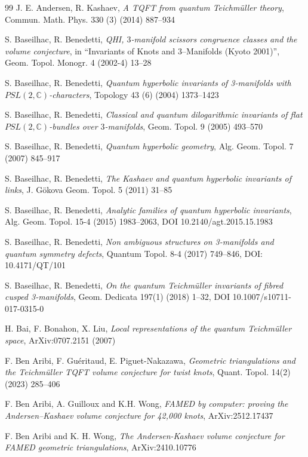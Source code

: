 \documentclass[11pt]{amsart}
\newcommand{\mc}{\mathbb{C}}
\begin{document}
\begin{thebibliography}{99} 
 J. E. Andersen, R. Kashaev, {\it A TQFT from quantum Teichm\"uller theory}, Commun. Math. Phys. 330 (3) (2014) 887--934

 S. Baseilhac, R. Benedetti, \emph{QHI, $3$-manifold scissors congruence classes and the volume conjecture}, in ``Invariants of Knots and 3--Manifolds (Kyoto 2001)'', Geom. Topol. Monogr. 4 (2002-4) 13--28

 S. Baseilhac, R. Benedetti, \emph{Quantum hyperbolic invariants of 3-manifolds with $PSL(2,\mc)$-characters}, Topology 43 (6) (2004) 1373--1423

 S. Baseilhac, R. Benedetti, \emph{Classical and quantum dilogarithmic invariants of flat $PSL(2,\mc)$-bundles over $3$-manifolds}, Geom. Topol. 9 (2005) 493--570

 S. Baseilhac, R. Benedetti, \emph{Quantum hyperbolic geometry}, Alg. Geom. Topol. 7 (2007) 845--917

 S. Baseilhac, R. Benedetti, \emph{The Kashaev and quantum hyperbolic invariants of links}, J. Gökova Geom. Topol. 5 (2011) 31--85

 S. Baseilhac, R. Benedetti, {\it Analytic families of quantum hyperbolic invariants}, Alg. Geom. Topol. 15-4 (2015) 1983--2063, DOI 10.2140/agt.2015.15.1983

 S. Baseilhac, R. Benedetti, {\it Non ambiguous structures on 3-manifolds and quantum symmetry defects}, Quantum Topol. 8-4 (2017) 749--846, DOI: 10.4171/QT/101

 S. Baseilhac, R. Benedetti, {\it On the quantum Teichm\"uller invariants of fibred cusped 3-manifolds}, Geom. Dedicata 197(1) (2018) 1--32, DOI 10.1007/s10711-017-0315-0

 H. Bai, F. Bonahon, X. Liu, \emph{Local representations of the quantum Teichm\"uller space}, ArXiv:0707.2151 (2007)

 F. Ben Aribi, F. Guéritaud, E. Piguet-Nakazawa, {\it Geometric triangulations and the Teichm\"uller TQFT volume conjecture for twist knots}, Quant. Topol. 14(2) (2023) 285--406 

 F. Ben Aribi, A. Guilloux and K.H. Wong, \emph{FAMED by computer: proving the Andersen–Kashaev volume conjecture for 42,000 knots}, ArXiv:2512.17437

 F. Ben Aribi and K. H. Wong, \emph{The Andersen-Kashaev volume conjecture
for FAMED geometric triangulations}, ArXiv:2410.10776


\end{thebibliography}
\end{document}
